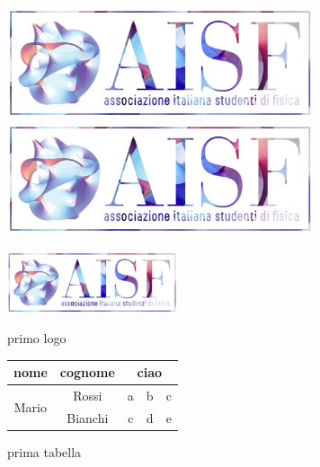 \documentclass[a4paper, 12pt]{article} %
\begin{document}
\begin{figure}[H]
\hspace{-2.25cm}
\begin{minipage}{.5\textwidth}
\centering
\includegraphics[width=9cm]{ai-sf.png}
\end{minipage}
\hspace{2cm}
\begin{minipage}{.5\textwidth}
\centering
\includegraphics[width=9cm]{ai-sf.png}
\end{minipage}
\end{figure}

\begin{figure}[H]
\begin{minipage}{.4\textwidth}
\centering
\includegraphics[width=5cm]{ai-sf.png}
\caption{primo logo}
\label{fig:logo1}
\end{minipage}
\begin{minipage}{.6\textwidth}
\centering
{\renewcommand{\arraystretch}{1.5}\renewcommand{\tabcolsep}{0.5cm}
\begin{tabular}{|c|c|c|c|c|}
\hline
nome & cognome & \multicolumn{3}{|c|}{ciao} \\
\hline
\multirow{2}{*}{Mario} & Rossi & a & b & c \\ \cline{3-5}
& Bianchi & c & d & e \\
\hline
\end{tabular}
}
\caption{prima tabella} %
\label{tab:tabella}
\end{minipage}
\end{figure}

\end{document}
